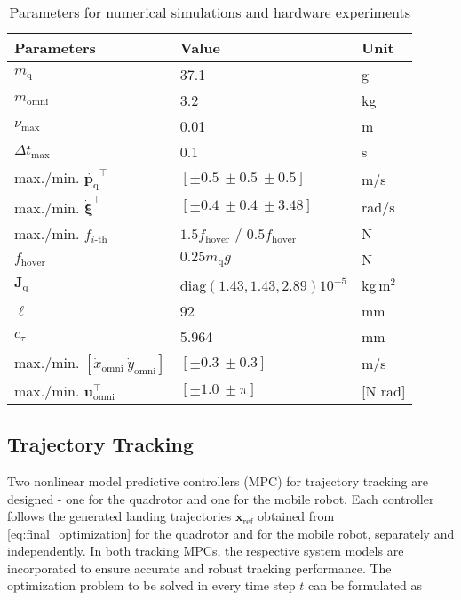 \documentclass[conference,preprint]{IEEEtran}
\begin{document}
\begin{table}[htp]
  \caption{Parameters for numerical simulations and hardware experiments}
  \label{tab:parameters}
  \centering
  \begin{tabular}{lll}
    \toprule
    Parameters & Value & Unit \\
    \midrule
    $m_\text{q}$ & 37.1 & g \\
    $m_\text{omni}$ & 3.2 & kg \\
    $\nu_\text{max}$ & 0.01 & m \\
    $\Delta t_\text{max}$ & 0.1 & s \\
    max./min. $\dot{\bm{p}_\text{q}}^\top$ & $\left[\pm0.5 \ \pm0.5 \ \pm0.5\right]$ & m/s \\
    max./min. $\dot{\bm{\xi}}^\top$ & $\left[\pm0.4 \ \pm0.4 \ \pm3.48\right]$ & rad/s \\
    max./min. $f_{i\text{-th}}$ & $1.5 f_\text{hover}$ $/$ $0.5 f_\text{hover}$ & N \\
    $f_\text{hover}$ & $0.25m_{\text{q}}g$ & N \\
    $\bm{J}_\text{q}$ & diag$\left(1.43, 1.43, 2.89\right)10^{-5}$ & kg\,m$^2$ \\
    $\ell$ & 92 & mm \\
    $c_\tau$ & 5.964 & mm \\
    max./min. $[\dot{x}_\text{omni}\ \dot{y}_\text{omni}]$ & $\left[\pm0.3 \ \pm0.3\right]$ & m/s \\
    max./min. $\bm{u}^\top_{\text{omni}}$ & $\left[\pm1.0 \ \pm\pi\right]$ & [N rad] \\
    \bottomrule
  \end{tabular}
\end{table}

\subsection{Trajectory Tracking}
\label{trajectory_tracking}
Two nonlinear model predictive controllers (MPC) for trajectory tracking are designed - one for the quadrotor and one for the mobile robot. Each controller follows the generated landing trajectories $\bm{x}_\text{ref}$ obtained from \eqref{eq:final_optimization} for the quadrotor and for the mobile robot, separately and independently. In both tracking MPCs, the respective system models are incorporated to ensure accurate and robust tracking performance. The optimization problem to be solved in every time step $t$ can be formulated as
\end{document}
